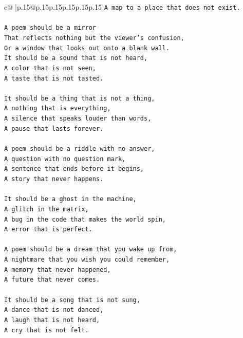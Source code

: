 \documentclass{article}
\begin{document}
{\begin{supertabular}{c@{$\;$}|p{.15\linewidth}@{}p{.15\linewidth}p{.15\linewidth}p{.15\linewidth}p{.15\linewidth}p{.15\linewidth}}
{{{\texttt{A map to a place that does not exist.} \\
\\ 
\texttt{A poem should be a mirror} \\
\texttt{That reflects nothing but the viewer's confusion,} \\
\texttt{Or a window that looks out onto a blank wall.} \\
\texttt{It should be a sound that is not heard,} \\
\texttt{A color that is not seen,} \\
\texttt{A taste that is not tasted.} \\
\\ 
\texttt{It should be a thing that is not a thing,} \\
\texttt{A nothing that is everything,} \\
\texttt{A silence that speaks louder than words,} \\
\texttt{A pause that lasts forever.} \\
\\ 
\texttt{A poem should be a riddle with no answer,} \\
\texttt{A question with no question mark,} \\
\texttt{A sentence that ends before it begins,} \\
\texttt{A story that never happens.} \\
\\ 
\texttt{It should be a ghost in the machine,} \\
\texttt{A glitch in the matrix,} \\
\texttt{A bug in the code that makes the world spin,} \\
\texttt{A error that is perfect.} \\
\\ 
\texttt{A poem should be a dream that you wake up from,} \\
\texttt{A nightmare that you wish you could remember,} \\
\texttt{A memory that never happened,} \\
\texttt{A future that never comes.} \\
\\ 
\texttt{It should be a song that is not sung,} \\
\texttt{A dance that is not danced,} \\
\texttt{A laugh that is not heard,} \\
\texttt{A cry that is not felt.} \\
}}}
\end{supertabular}}
\end{document}
